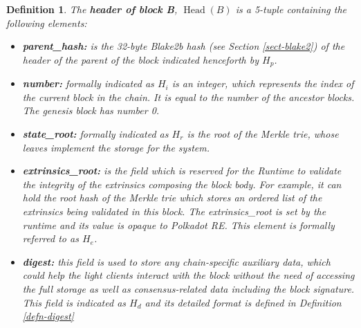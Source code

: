 \documentclass{book}
\newcommand{\tmop}[1]{\ensuremath{\operatorname{#1}}}
\newcommand{\tmsamp}[1]{\textsf{#1}}
\newcommand{\tmstrong}[1]{\textbf{#1}}
\newcommand{\tmtextbf}[1]{{\bfseries{#1}}}
\newcommand{\tmtextsf}[1]{{\sffamily{#1}}}
\newtheorem{definition}{Definition}
\providecommand{\tmop}[1]{\ensuremath{\mathrm{#1}}}
\providecommand{\tmsamp}[1]{\tmtextsf{#1}}
\providecommand{\tmstrong}[1]{\tmtextbf{#1}}
\providecommand{\tmtextbf}[1]{\tmtextbf{#1}}
\newtheorem{definition}{Definition}
\begin{document}
\begin{definition}
  \label{defn-block-header}The {\tmstrong{header of block B}},
  {\tmstrong{$\tmop{Head} (B)$}} is a 5-tuple containing the following
  elements:
  \begin{itemize}
    \item \tmtextbf{{\tmsamp{parent\_hash:}}} is the 32-byte Blake2b hash (see
    Section \ref{sect-blake2}) of the header of the parent of the block
    indicated henceforth by \tmtextbf{$H_p$}.
    
    \item {\tmstrong{{\tmsamp{number:}}}} formally indicated as
    {\tmstrong{$H_i$}} is an integer, which represents the index of the
    current block in the chain. It is equal to the number of the ancestor
    blocks. The genesis block has number 0.
    
    \item {\tmstrong{{\tmsamp{state\_root:}}}} formally indicated as
    {\tmstrong{$H_r$}} is the root of the Merkle trie, whose leaves implement
    the storage for the system.
    
    \item {\tmstrong{{\tmsamp{extrinsics\_root:}}}} is the field which is
    reserved for the Runtime to validate the integrity of the extrinsics
    composing the block body. For example, it can hold the root hash of the
    Merkle trie which stores an ordered list of the extrinsics being validated
    in this block. The {\tmsamp{extrinsics\_root}} is set by the runtime and
    its value is opaque to Polkadot RE. This element is formally referred to
    as {\tmstrong{$H_e$}}.
    
    \item {\tmstrong{{\tmsamp{digest:}}}} this field is used to store any
    chain-specific auxiliary data, which could help the light clients interact
    with the block without the need of accessing the full storage as well as
    consensus-related data including the block signature. This field is
    indicated as {\tmstrong{$H_d$}} and its detailed format is defined in
    Definition \ref{defn-digest}
  \end{itemize}
\end{definition}
\end{document}
